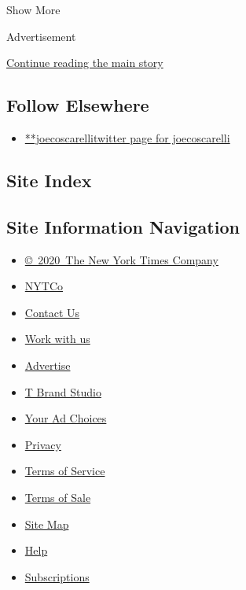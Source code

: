Show More

Advertisement

\protect\hyperlink{after-mid2}{Continue reading the main story}

\hypertarget{follow-elsewhere}{%
\subsection{Follow Elsewhere}\label{follow-elsewhere}}

\begin{itemize}
\tightlist
\item
  \href{https://twitter.com/joecoscarelli}{**joecoscarellitwitter page
  for joecoscarelli}
\end{itemize}

\hypertarget{site-index}{%
\subsection{Site Index}\label{site-index}}

\hypertarget{site-information-navigation}{%
\subsection{Site Information
Navigation}\label{site-information-navigation}}

\begin{itemize}
\tightlist
\item
  \href{https://help.nytimes3xbfgragh.onion/hc/en-us/articles/115014792127-Copyright-notice}{©~2020~The
  New York Times Company}
\end{itemize}

\begin{itemize}
\tightlist
\item
  \href{https://www.nytco.com/}{NYTCo}
\item
  \href{https://help.nytimes3xbfgragh.onion/hc/en-us/articles/115015385887-Contact-Us}{Contact
  Us}
\item
  \href{https://www.nytco.com/careers/}{Work with us}
\item
  \href{https://nytmediakit.com/}{Advertise}
\item
  \href{http://www.tbrandstudio.com/}{T Brand Studio}
\item
  \href{https://www.nytimes3xbfgragh.onion/privacy/cookie-policy\#how-do-i-manage-trackers}{Your
  Ad Choices}
\item
  \href{https://www.nytimes3xbfgragh.onion/privacy}{Privacy}
\item
  \href{https://help.nytimes3xbfgragh.onion/hc/en-us/articles/115014893428-Terms-of-service}{Terms
  of Service}
\item
  \href{https://help.nytimes3xbfgragh.onion/hc/en-us/articles/115014893968-Terms-of-sale}{Terms
  of Sale}
\item
  \href{https://spiderbites.nytimes3xbfgragh.onion}{Site Map}
\item
  \href{https://help.nytimes3xbfgragh.onion/hc/en-us}{Help}
\item
  \href{https://www.nytimes3xbfgragh.onion/subscription?campaignId=37WXW}{Subscriptions}
\end{itemize}

